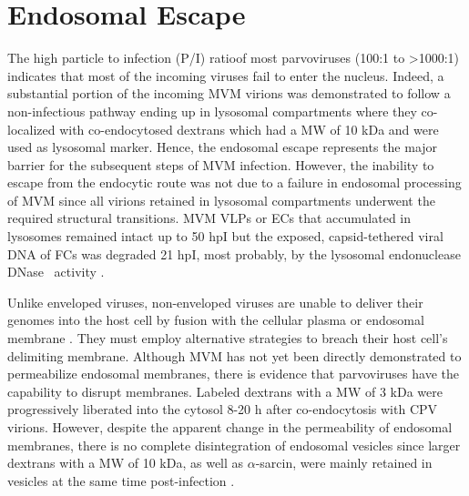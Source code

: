 \section{Endosomal Escape}
\label{Escape}
The high particle to infection (P/I) ratio\footnotemark of most parvoviruses (100:1 to >1000:1) \cite{pmid4673484, pmid20649475, pmid7288919} indicates that most of the incoming viruses fail to enter the nucleus. Indeed, a substantial portion of the incoming MVM virions was demonstrated to follow a non-infectious pathway ending up in lysosomal compartments where they co-localized with co-endocytosed dextrans which had a MW of 10 kDa and were used as lysosomal marker. Hence, the endosomal escape represents the major barrier for the subsequent steps of MVM infection. However, the inability to escape from the endocytic route was not due to a failure in endosomal processing of MVM since all virions retained in lysosomal compartments underwent the required structural transitions. MVM VLPs or ECs that accumulated in lysosomes remained intact up to 50 hpI but the exposed, capsid-tethered viral DNA of FCs was degraded 21 hpI, most probably, by the lysosomal endonuclease DNase~ activity \cite{pmid16379002}. 

Unlike enveloped viruses, non-enveloped viruses are unable to deliver their genomes into the host cell by fusion with the cellular plasma or endosomal membrane \cite{pmid18596815}. They must employ alternative strategies to breach their host cell's delimiting membrane. Although MVM has not yet been directly demonstrated to permeabilize endosomal membranes, there is evidence that parvoviruses have the capability to disrupt membranes. Labeled dextrans with a MW of 3 kDa were progressively liberated into the cytosol 8-20 h after co-endocytosis with CPV virions. However, despite the apparent change in the permeability of endosomal membranes, there is no complete disintegration of endosomal vesicles since larger dextrans with a MW of 10 kDa, as well as $\alpha$-sarcin, were mainly retained in vesicles at the same time post-infection \cite{pmid14644609, pmid10644365}.

